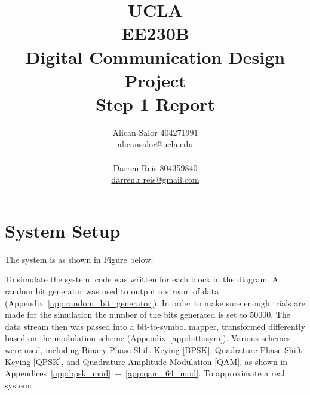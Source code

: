 \documentclass[]{article}
\title{UCLA\\EE230B\\Digital Communication Design Project\\Step 1 Report}
\author{Alican Salor 404271991 \\  \href{mailto:alicansalor@ucla.edu}{alicansalor@ucla.edu} \\ \\
Darren Reis 804359840 \\
\href{mailto:darrer.r.reis@gmail.com}{darren.r.reis@gmail.com} }
\begin{document}
\maketitle

\newpage
\tableofcontents

\newpage


\section{System Setup}
\label{sec:setup}
The system is as shown in Figure below:




To simulate the system, code was written for each block in the diagram.  A random bit generator was used to output a stream of data (Appendix~\ref{app:random_bit_generator}). In order to make sure enough trials are made for the simulation the number of the bits generated is set to 50000. The data stream then was passed into a bit-to-symbol mapper, transformed differently based on the modulation scheme (Appendix~\ref{app:bittosym}).  Various schemes were used, including Binary Phase Shift Keying [BPSK], Quadrature Phase Shift Keying [QPSK], and Quadrature Amplitude Modulation [QAM], as shown in Appendices~\ref{app:bpsk_mod}~$-$~\ref{app:qam_64_mod}. To approximate a real system:
\end{document}

